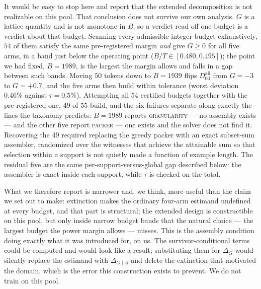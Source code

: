 \documentclass[10pt,twocolumn]{article}
\begin{document}
\begin{table}[tb]
\centering
\footnotesize
\setlength{\tabcolsep}{4pt}

\caption{Support structure of the gated mathematics pool. Extinct supports have positive source
mass and zero gate-eligible mass, so Proposition~\ref{prop:ext} applies.
\tabmathcaption{}
At the pre-registered operating point the survivor-conditional arms assemble and the arm that
must reproduce the full source support does not. That failure is specific to this budget: see the
budget scan in the text.}
\label{tab:math}
\end{table}

It would be easy to stop here and report that the extended decomposition is not realizable on
this pool. That conclusion does not survive our own analysis. $G$ is a lattice quantity and is
not monotone in $B$, so a verdict read off one budget is a verdict about that budget. Scanning
every admissible integer budget exhaustively, $54$ of them satisfy the same pre-registered margin
\emph{and} give $G\ge0$ for all five arms, in a band just below the operating point
($B/T\in[0.480,0.495]$); the point we had fixed, $B=1989$, is the largest the margin allows and
falls in a gap between such bands. Moving $50$ tokens down to $B=1939$ flips
$D_{00}^{\mathrm{all}}$ from $G=-3$ to $G=+0.7$, and the five arms then build within tolerance
(worst deviation $0.46\%$ against $\tau=0.5\%$). Attempting all $54$ certified budgets together
with the pre-registered one, $49$ of $55$ build, and the six failures separate along exactly the
lines the taxonomy predicts: $B=1989$ reports \textsc{granularity} --- no assembly exists --- and
the other five report \textsc{packer} --- one exists and the solver does not find it. Recovering
the $49$ required replacing the greedy packer with an exact subset-sum assembler, randomized over
the witnesses that achieve the attainable sum so that selection within a support is not quietly
made a function of example length. The residual five are the same per-support-versus-global gap
described below: the assembler is exact inside each support, while $\tau$ is checked on the total.

What we therefore report is narrower and, we think, more useful than the claim we set out to
make: extinction makes the ordinary four-arm estimand undefined at every budget, and that part is
structural; the extended design is constructible on this pool, but only inside narrow budget
bands that the natural choice --- the largest budget the power margin allows --- misses. This is
the assembly condition doing exactly what it was introduced for, on us. The survivor-conditional terms
could be computed and would look like a result; substituting them for $\Delta_G$ would silently
replace the estimand with $\Delta_{G\mid A}$ and delete the extinction that motivated the domain,
which is the error this construction exists to prevent. We do not train on this pool.
\end{document}

